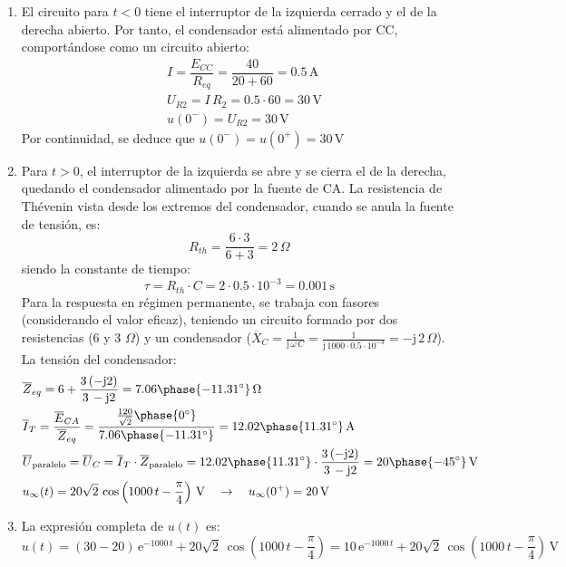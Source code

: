 \begin{enumerate}
    \item El circuito para $t<0$ tiene el interruptor de la izquierda cerrado y el de la derecha abierto. Por tanto, el condensador está alimentado por CC, comportándose como un circuito abierto:
    \begin{align*}
        &I=\dfrac{E_{CC}}{R_{eq}}=\dfrac{40}{20+60}=0.5\,\si{\ampere}\\
        &U_{R2}=I\,R_2=0.5\cdot 60=30\,\si{\volt}\\
        &u(0^-)=U_{R2}=30\,\si{\volt}
    \end{align*}
    Por continuidad, se deduce que $u(0^-)=u(0^+)=30\,\si{\volt}$ 
    \item Para $t>0$, el interruptor de la izquierda se abre y se cierra el de la derecha, quedando el condensador alimentado por la fuente de CA. 
    La resistencia de Thévenin vista desde los extremos del condensador, cuando se anula la fuente de tensión, es:
    \begin{equation*}
        R_{th}=\dfrac{6\cdot 3}{6+3}=2\,\Omega
    \end{equation*}
    siendo la constante de tiempo:
    \begin{equation*}
        \tau=R_{th}\cdot C=2\cdot0.5\cdot10^{-3}=0.001\,\si{\second}
    \end{equation*}
    Para la respuesta en régimen permanente, se trabaja con fasores (considerando el valor eficaz), teniendo un circuito formado por dos resistencias (6 y 3 $\Omega$) y un condensador ($\overline{X}_C=\frac{1}{\mathrm{j}\,\omega\,C}=\frac{1}{\mathrm{j}\,1000\cdot 0.5\cdot 10^{-3}}=-\mathrm{j}\,2\,\Omega$). La tensión del condensador:
    \begin{align*}
        &\overline{Z}_{eq}=6+\dfrac{3\,(-\mathrm{j}2)}{3\,-\mathrm{j}2}=7.06\phase{-11.31^\circ}\,\Omega\\
        &\overline{I}_T=\dfrac{\overline{E}_{CA}}{\overline{Z}_{eq}}=\dfrac{\frac{120}{\sqrt{2}}\phase{0^\circ}}{7.06\phase{-11.31^\circ}}=12.02\phase{11.31^\circ} \,\si{\ampere}\\
        &\overline{U}_{\textrm{paralelo}}=\overline{U}_C=\overline{I}_T\cdot\overline{Z}_{\textrm{paralelo}}=12.02\phase{11.31^\circ}\cdot \dfrac{3\,(-\mathrm{j}2)}{3\,-\mathrm{j}2}=20\phase{-45^\circ}\,\si{\volt}\\
        &u_\infty(t)=20\sqrt{2}\,\cos\left(1000\,t-\frac{\pi}{4}\right)\,\si{\volt} \quad\rightarrow\quad u_\infty(0^+)=20\,\si{\volt}
    \end{align*}
    \item La expresión completa de $u(t)$ es:
    \begin{equation*}
        u(t)=\left(30-20 \right)\,\mathrm{e}^{-1000\,t}+20\sqrt{2}\,\cos\left(1000\,t-\frac{\pi}{4}\right)=10\,\mathrm{e}^{-1000\,t}+20\sqrt{2}\,\cos\left(1000\,t-\frac{\pi}{4}\right)\,\si{\volt}
    \end{equation*}
\end{enumerate}


